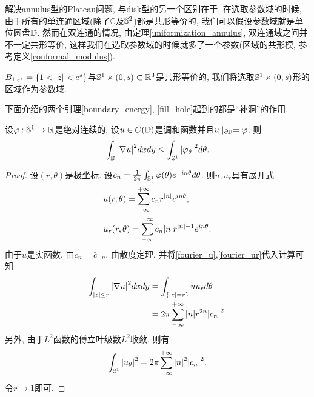 \par 解决annulus型的Plateau问题, 与disk型的另一个区别在于, 在选取参数域的时候, 由于所有的单连通区域(除了$\mathbb{C}$及$\S^2$)都是共形等价的, 我们可以假设参数域就是单位圆盘$\D$. 然而在双连通的情况, 由定理\eqref{uniformization_annulus}, 双连通域之间并不一定共形等价, 这样我们在选取参数域的时候就多了一个参数(区域的共形模, 参考定义\eqref{conformal_modulus}).  
\begin{remark}
    $B_{1,e^s}=\{1<\abs{z}< e^s\}$与$\S^1\times (0, s)\subset \R^3$是共形等价的,  我们将选取$\S^1\times (0,s)$形的区域作为参数域.
\end{remark}
下面介绍的两个引理\eqref{boundary_energy}, \eqref{fill_hole}起到的都是``补洞''的作用.
\begin{lemma} \label{boundary_energy}
    设$\phi: \S^1 \to \R$是绝对连续的,  设$u\in C(\D)$是调和函数并且$u\mid_{\P \D}=\phi$. 则
    \begin{equation}
        \int_{\D} \abs{\nabla u}^2dxdy \le \int_{\S^1} \abs{\phi_\theta}^2d\theta.
    \end{equation}
\end{lemma}
\begin{proof}
    设$(r,\theta)$是极坐标. 设$c_n=\rec{2\pi}\int_{\S^1} \phi(\theta)e^{-i n \theta}d\theta$. 则$u, u_r$具有展开式
    \begin{align}
        &u(r,\theta)=\sum_{-\infty}^{+\infty}c_n r^{\abs{n}}e^{in\theta}, \label{fourier_u} \\
        &u_r(r,\theta)=\sum_{-\infty}^{+\infty}c_n\abs{n} r^{\abs{n}-1}e^{in\theta}. \label{fourier_ur}
    \end{align}
    由于$u$是实函数, 由$c_n=\bar{c}_{-n}$. 由散度定理, 并将\eqref{fourier_u},\eqref{fourier_ur}代入计算可知
    \begin{equation}
        \begin{split}
            \int_{{\abs{z}\le r}}\abs{\nabla u}^2dxdy & =\int_{\{\abs{z}=r\}}uu_rd\theta\\
            &=2\pi \sum_{-\infty}^{+\infty}\abs{n}r^{2n}\abs{c_n}^2.
        \end{split}
    \end{equation}
    另外, 由于$L^2$函数的傅立叶级数$L^2$收敛, 则有
    \begin{equation}
        \int_{\S^1} \abs{u_\theta}^2 = 2\pi\sum_{-\infty}^{+\infty} \abs{n}^2\abs{c_n}^2.
    \end{equation}
    令$r \to 1$即可.
\end{proof}
